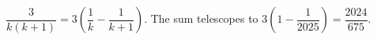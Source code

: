 $\dfrac{3}{k(k+1)}=3(\dfrac{1}{k}-\dfrac{1}{k+1})$. The sum telescopes to $3(1-\dfrac{1}{2025})=\boxed{\dfrac{2024}{675}}$.
